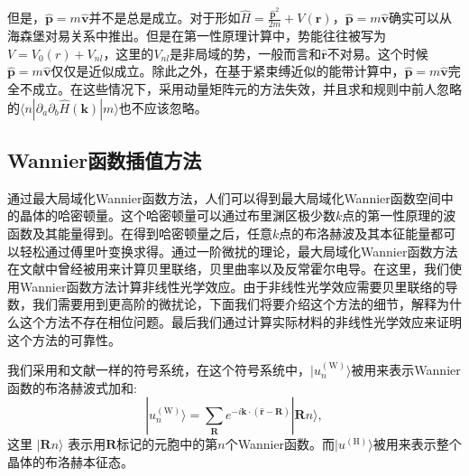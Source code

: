 但是，$\hat{\mathbf{p}}=m\hat{\mathbf{v}}$并不是总是成立。对于形如$\hat{H}=\frac{\hat{\mathbf{p}}^{2}}{2m}+V(\mathbf{r})$，$\hat{\mathbf{p}}=m\hat{\mathbf{v}}$确实可以从海森堡对易关系中推出。但是在第一性原理计算中，势能往往被写为 $V=V_{0}(r)+V_{nl}$，这里的$V_{nl}$是非局域的势，一般而言和$\hat{\mathbf{r}}$不对易。这个时候$\hat{\mathbf{p}}= m\hat{\mathbf{v}}$仅仅是近似成立。除此之外，在基于紧束缚近似的能带计算中，$\hat{\mathbf{p}}=m\hat{\mathbf{v}}$完全不成立。在这些情况下，采用动量矩阵元的方法失效，并且求和规则中前人\cite{sipe_second-order_2000}忽略的$\langle n|\partial_{a}\partial_{b}\hat{H}(\mathbf{k})|m\rangle$也不应该忽略。


\subsection{Wannier函数插值方法}

通过最大局域化Wannier函数方法，人们可以得到最大局域化Wannier函数空间中的晶体的哈密顿量。这个哈密顿量可以通过布里渊区极少数$k$点的第一性原理的波函数及其能量得到。在得到哈密顿量之后，任意$k$点的布洛赫波及其本征能量都可以轻松通过傅里叶变换求得。通过一阶微扰的理论，最大局域化Wannier函数方法在文献中曾经被用来计算贝里联络，贝里曲率以及反常霍尔电导。在这里，我们使用Wannier函数方法计算非线性光学效应。由于非线性光学效应需要贝里联络的导数，我们需要用到更高阶的微扰论，下面我们将要介绍这个方法的细节，解释为什么这个方法不存在相位问题。最后我们通过计算实际材料的非线性光学效应来证明这个方法的可靠性。

我们采用和文献一样的符号系统，在这个符号系统中，$|u_{n}^{(\textrm{W})}\rangle$被用来表示Wannier函数的布洛赫波式加和: 
\[
|u_{n}^{(\textrm{W})}\rangle=\sum_{\mathbf{R}}e^{-i\mathbf{k}\cdot(\hat{\mathbf{r}}-\mathbf{R})}|\mathbf{R}n\rangle,
\]
这里 $|\mathbf{R}n\rangle$ 表示用$\mathbf{R}$标记的元胞中的第$n$个Wannier函数。而$|u^{(\textrm{H})}\rangle$被用来表示整个晶体的布洛赫本征态。

